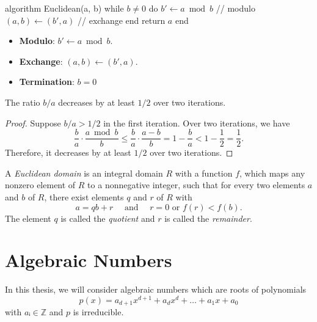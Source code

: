 \begin{Pseudocode}
algorithm Euclidean(a, b)
  while $b ≠ 0$ do
    $b' ← a \bmod b$ // modulo
    $(a, b) ← (b', a)$ // exchange
  end
  return $a$
end
\end{Pseudocode}

\begin{itemize}
  \item \textbf{Modulo}: $b' ← a \bmod b$.
  \item \textbf{Exchange}: $(a, b) ← (b', a)$.
  \item \textbf{Termination}: $b = 0$
\end{itemize}

\begin{proposition}
  The ratio $b/a$ decreases by at least $1/2$ over two iterations.
\end{proposition}

\begin{proof}
  Suppose $b/a > 1/2$ in the first iteration.
  Over two iterations, we have
  \[
    \frac{b}{a} · \frac{a \bmod b}{b}
    ≤ \frac{b}{a} · \frac{a - b}{b}
    = 1 - \frac{b}{a}
    < 1 - \frac{1}{2}
    = \frac{1}{2}.
  \]
  Therefore, it decreases by at least $1/2$ over two iterations.
\end{proof}

\begin{definition}
  A \emph{Euclidean domain} is an integral domain $R$ with a function $f$,
  which maps any nonzero element of $R$ to a nonnegative integer,
  such that for every two elements $a$ and $b$ of $R$, there exist elements $q$ and $r$ of $R$ with
  \[
    a = qb + r \quad \text{ and } \quad r = 0 \text{ or } f(r) < f(b).
  \]
  The element $q$ is called the \emph{quotient} and $r$ is called the \emph{remainder}.
\end{definition}

\begin{example}
\end{example}


\section{Algebraic Numbers}

In this thesis, we will consider algebraic numbers which are roots of polynomials
\[
  p(x) = a_{d+1} x^{d+1} + a_d x^d + \dots + a_1 x + a_0
\]
with $aᵢ ∈ ℤ$ and $p$ is irreducible.

